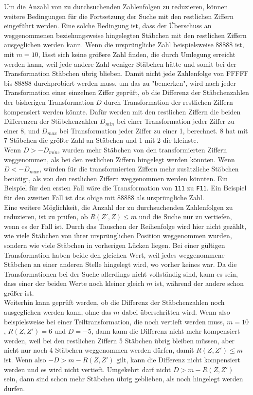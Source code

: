 \documentclass[a4paper,10pt,ngerman]{scrartcl}
\begin{document}
Um die Anzahl von zu durchsuchenden Zahlenfolgen zu reduzieren, können weitere Bedingungen für die Fortsetzung der Suche mit den restlichen Ziffern eingeführt werden. Eine solche Bedingung ist, dass der Überschuss an weggenommenen beziehungsweise hingelegten Stäbchen mit den restlichen Ziffern ausgeglichen werden kann. Wenn die ursprüngliche Zahl beispielsweise 88888 ist, mit $m=10$, lässt sich keine größere Zahl finden, die durch Umlegung erreicht werden kann, weil jede andere Zahl weniger Stäbchen hätte und somit bei der Transformation Stäbchen übrig blieben. Damit nicht jede Zahlenfolge von FFFFF bis 88888 durchprobiert werden muss, um das zu "bemerken", wird nach jeder Transformation einer einzelnen Ziffer geprüft, ob die Differenz der Stäbchenzahlen der bisherigen Transformation $D$ durch Transformation der restlichen Ziffern kompensiert werden könnte. Dafür werden mit den restlichen Ziffern die beiden Differenzen der Stäbchenzahlen $D_{min}$ bei einer Transformation jeder Ziffer zu einer 8, und $D_{max}$ bei Transformation jeder Ziffer zu einer 1, berechnet. 8 hat mit 7 Stäbchen die größte Zahl an Stäbchen und 1 mit 2 die kleinste.\\ Wenn $D > -D_{min}$, wurden mehr Stäbchen von den transformierten Ziffern weggenommen, als bei den restlichen Ziffern hingelegt werden könnten. Wenn $D < -D_{max}$, würden für die transformierten Ziffern mehr zusätzliche Stäbchen benötigt, als von den restlichen Ziffern weggenommen werden könnten. Ein Beispiel für den ersten Fall wäre die Transformation von \lstinline|111| zu \lstinline|F11|. Ein Beispiel für den zweiten Fall ist das obige mit 88888 als ursprüngliche Zahl. \\
Eine weitere Möglichkeit, die Anzahl der zu durchsuchenden Zahlenfolgen zu reduzieren, ist zu prüfen, ob $R(Z', Z) \leq m$ und die Suche nur zu vertiefen, wenn es der Fall ist. Durch das Tauschen der Reihenfolge wird hier nicht gezählt, wie viele Stäbchen von ihrer ursprünglichen Position weggenommen wurden, sondern wie viele Stäbchen in vorherigen Lücken liegen. Bei einer gültigen Transformation haben beide den gleichen Wert, weil jedes weggenommene Stäbchen an einer anderen Stelle hingelegt wird, wo vorher keines war. Da die Transformationen bei der Suche allerdings nicht vollständig sind, kann es sein, dass einer der beiden Werte noch kleiner gleich $m$ ist, während der andere schon größer ist. \\
Weiterhin kann geprüft werden, ob die Differenz der Stäbchenzahlen noch ausgeglichen werden kann, ohne das $m$ dabei überschritten wird. Wenn also beispielsweise bei einer Teiltransformation, die noch vertieft werden muss, $m=10$, $R(Z, Z')=6$ und $D=-5$, dann kann die Differenz nicht mehr kompensiert werden, weil bei den restlichen Ziffern 5 Stäbchen übrig bleiben müssen, aber nicht nur noch 4 Stäbchen weggenommen werden dürfen, damit $R(Z, Z') \leq m$ ist. Wenn also $-D>m-R(Z, Z')$ gilt, kann die Differenz nicht kompensiert werden und es wird nicht vertieft. Umgekehrt darf nicht $D>m-R(Z, Z')$ sein, dann sind schon mehr Stäbchen übrig geblieben, als noch hingelegt werden dürfen. \\
\end{document}
